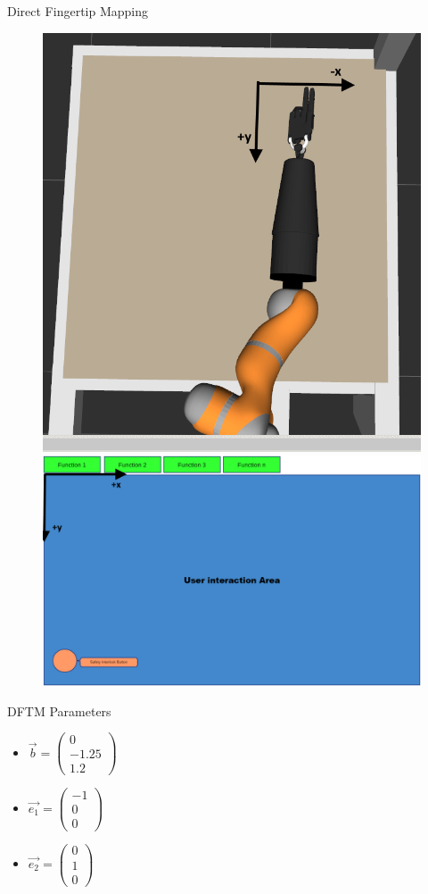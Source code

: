\documentclass[t]{beamer}
\newcommand{\vecthr}[3]{
	\left(
	\begin{matrix}
		#1 \\
		#2 \\
		#3
	\end{matrix}
	\right)
}
\begin{document}
\begin{frame}{Direct Fingertip Mapping}
\begin{figure}
	\includegraphics[height=0.55\textheight]{assets/chpt_concepts/dfmt_coord_arm}
	\includegraphics[height=0.55\textheight]{assets/chpt_concepts/dfmt_coord_screen}
\end{figure}
\end{frame}

\begin{frame}{DFTM Parameters}
\begin{itemize}
	\item $\vec{b} = \vecthr{0}{-1.25}{1.2}$
	\item $\vec{e_1} = \vecthr{-1}{0}{0}$
	\item $\vec{e_2} = \vecthr{0}{1}{0}$
\end{itemize}
\end{frame}
\end{document}

